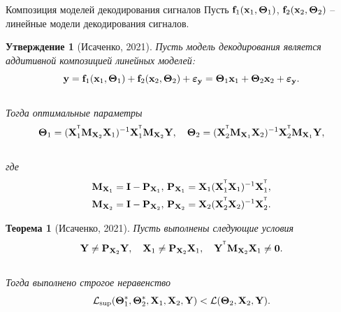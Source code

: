 \documentclass[10pt]{beamer}
\newtheorem{statement}{Утверждение}
\newtheorem{rustheorem}{Теорема}
\begin{document}
\begin{frame}{Композиция моделей декодирования сигналов}
	Пусть $\mathbf{f}_1(\bx_1, \bTheta_1)$, $\mathbf{f}_2(\bx_2, \bTheta_2)$ -- линейные модели декодирования сигналов. 
	\begin{statement}[Исаченко, 2021]
		Пусть модель декодирования является аддитивной композицией линейных моделей:
		\vspace{-0.3cm}
		\[
			\by = \mathbf{f}_1(\bx_1, \bTheta_1) + \mathbf{f}_2(\bx_2, \bTheta_2) + \boldsymbol{\varepsilon}_{\by} = \bTheta_1 \bx_1 + \bTheta_2 \bx_2 + \boldsymbol{\varepsilon}_{\by}.
		\]
		\vspace{-0.5cm} \\
		Тогда оптимальные параметры
		\vspace{-0.2cm}
		\[
			\bTheta_1 = (\bX_1^{\T} \bM_{\bX_2} \bX_1)^{-1} \bX_1^{\T} \bM_{\bX_2} \bY, \quad 
			\bTheta_2 = (\bX_2^{\T} \bM_{\bX_1} \bX_2)^{-1} \bX_2^{\T} \bM_{\bX_1} \bY,
		\]
		\vspace{-0.5cm} \\
		где 
		\vspace{-0.5cm}
		\begin{align*} 
			\bM_{\bX_1} &= \bI - \bP_{\bX_1}, \, \bP_{\bX_1} = \bX_1 (\bX_1^{\T} \bX_1)^{-1} \bX_1^{\T}, \\
			 \bM_{\bX_2} &= \bI - \bP_{\bX_2}, \, \bP_{\bX_2} = \bX_2 (\bX_2^{\T} \bX_2)^{-1} \bX_2^{\T}.
		\end{align*}
		\vspace{-0.8cm}
	\end{statement}
	\begin{rustheorem}[Исаченко, 2021]
		Пусть  выполнены следующие условия
		\vspace{-0.2cm}
		\[
			\bY \neq \bP_{\bX_2} \bY, \quad \bX_1 \neq \bP_{\bX_2} \bX_1, \quad \bY^{\T} \bM_{\bX_2} \bX_1 \neq \bZero.
		\]
		\vspace{-0.5cm} \\
		Тогда выполнено строгое неравенство
		\vspace{-0.2cm}
		\[
			\cL_{\textnormal{sup}}(\bTheta_1^*, \bTheta_2^*, \bX_1, \bX_2, \bY) < \cL(\bTheta_2, \bX_2, \bY).
		\]
	\end{rustheorem}
\end{frame}
\end{document}
